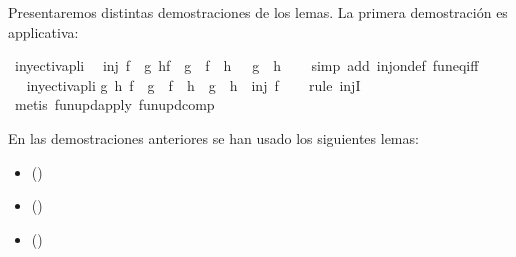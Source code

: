 \begin{isabellebody}
\begin{isamarkuptext}
  Presentaremos distintas demostraciones de los lemas. La primera
  demostración es applicativa:%
\end{isamarkuptext}\isamarkuptrue%
\isamarkupfalse%
\ inyectivapli{\isacharcolon}\isanewline
\ \ {\isachardoublequoteopen}inj\ f\ {\isasymLongrightarrow}\ {\isacharparenleft}{\isasymforall}g\ h{\isachardot}{\isacharparenleft}f\ {\isasymcirc}\ g\ {\isacharequal}\ f\ {\isasymcirc}\ h{\isacharparenright}\ {\isasymlongrightarrow}\ \ {\isacharparenleft}g\ {\isacharequal}\ h{\isacharparenright}{\isacharparenright}{\isachardoublequoteclose}\isanewline
%
\isadelimproof
\ \ %
\endisadelimproof
%
\isatagproof
{}\isamarkupfalse%
\ {\isacharparenleft}simp\ add{\isacharcolon}\ inj{\isacharunderscore}on{\isacharunderscore}def\ fun{\isacharunderscore}eq{\isacharunderscore}iff{\isacharparenright}\ \isanewline
\ \ \isamarkupfalse%
%
\endisatagproof
{\isafoldproof}%
%
\isadelimproof
\ \isanewline
%
\endisadelimproof
\isanewline
{}\isamarkupfalse%
\ inyectivapli{}{\isacharcolon}\isanewline
{\isachardoublequoteopen}{\isasymforall}g\ h{\isachardot}\ {\isacharparenleft}f\ {\isasymcirc}\ g\ {\isacharequal}\ f\ {\isasymcirc}\ h\ {\isasymlongrightarrow}\ g\ {\isacharequal}\ h{\isacharparenright}\ {\isasymLongrightarrow}\ inj\ f{\isachardoublequoteclose}\isanewline
%
\isadelimproof
\ \ %
\endisadelimproof
%
\isatagproof
{}\isamarkupfalse%
\ {\isacharparenleft}rule\ injI{\isacharparenright}\isanewline
\ \ \isamarkupfalse%
\ {\isacharparenleft}metis\ fun{\isacharunderscore}upd{\isacharunderscore}apply\ fun{\isacharunderscore}upd{\isacharunderscore}comp{\isacharparenright}%
\endisatagproof
{\isafoldproof}%
%
\isadelimproof
%
\endisadelimproof
%
\begin{isamarkuptext}%
En las demostraciones anteriores se han usado los siguientes
 lemas:
  \begin{itemize}
    \item[]  
      \hfill ()
  \end{itemize} 
  \begin{itemize}
    \item[]  
      \hfill ()
  \end{itemize} 
  \begin{itemize}
    \item[]  
      \hfill ()
  \end{itemize} 


\end{isamarkuptext}
\end{isabellebody}

